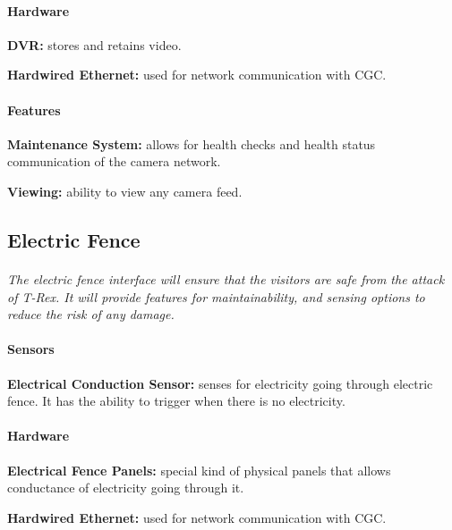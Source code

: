\documentclass[12pt]{article}
\begin{document}
	\paragraph{Hardware}
	\begin{list}{}{}
		\item \textbf{DVR: }stores and retains video.
		\item \textbf{Hardwired Ethernet: }used for network communication with CGC. 
	\end{list}
	
	\paragraph{Features}
	\begin{list}{}{}
		\item \textbf{Maintenance System: }allows for health checks and health status 
		communication of the camera network.
        \item \textbf{Viewing:} ability to view any camera feed.
	\end{list}

	\subsection{Electric Fence}
	\paragraph{} \textit{The electric fence interface will ensure that the visitors are 
	safe from the attack of T-Rex. 	It will provide features for maintainability, and 
	sensing options to reduce the risk of any damage.}		
	
	\paragraph{Sensors}
	\begin{list}{}{}
		\item \textbf{Electrical Conduction Sensor: }senses for electricity going through 
		electric fence. It has the ability to trigger when there is no electricity. 
	\end{list}
		
	\paragraph{Hardware}
	\begin{list}{}{}
		\item \textbf{Electrical Fence Panels: }special kind of physical panels that 
		allows conductance of electricity going through it. 
		\item \textbf{Hardwired Ethernet: }used for network communication with CGC. 
	\end{list}
	
\end{document}
